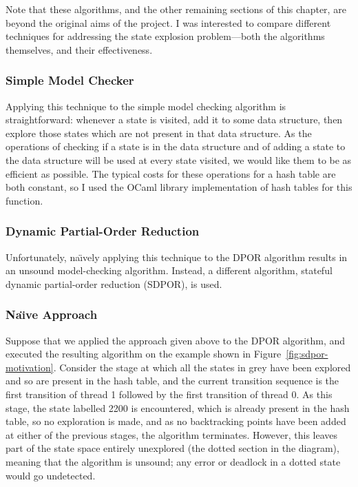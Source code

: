 \documentclass[12pt,a4paper,twoside,openright]{report}
\begin{document}
Note that these algorithms,
and the other remaining sections of this chapter,
are beyond the original aims of the project. I
was interested to compare different techniques for
addressing the state explosion problem---both the
algorithms themselves, and their effectiveness.

\subsubsection{Simple Model Checker}

Applying this technique to the simple model
checking algorithm is straightforward: whenever
a state is visited, add it to some data structure,
then explore those states which are not
present in that data structure. As the operations
of checking if a state is in the data structure
and of adding a state to the data structure will
be used at every state visited, we would like them
to be as efficient as possible. The typical costs
for these operations for a hash table are both
constant, so I used the OCaml library implementation
of hash tables for this function.

\subsubsection{Dynamic Partial-Order Reduction}
Unfortunately, na\"{\i}vely
applying this technique to the DPOR
algorithm results in an
unsound model-checking algorithm. Instead,
a different algorithm, stateful dynamic
partial-order reduction (SDPOR), is used.

\subsubsection{Na\"{\i}ve Approach}

Suppose that we applied the approach
given above to the DPOR algorithm,
and executed the resulting algorithm
on the example shown in
Figure~\ref{fig:sdpor-motivation}.
Consider the stage at which
all the states in grey have been
explored and so are present in the hash table,
and the current transition sequence is the first
transition of thread 1 followed by the first
transition of thread 0. As this stage, the state
labelled 2200 is encountered, which is already
present in the hash table, so no exploration is
made, and as no backtracking points have been added
at either of the previous stages, the algorithm
terminates. However, this leaves part of the state
space entirely unexplored (the dotted section in
the diagram), meaning that the algorithm is unsound;
any error or deadlock in a dotted state would go
undetected.
\end{document}
